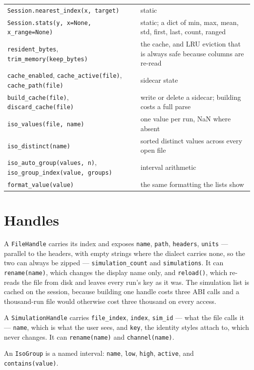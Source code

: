 \documentclass[11pt,a4paper,oneside]{report}
\newcommand{\code}[1]{\texttt{#1}}
\begin{document}
\begin{longtable}{@{}p{}p{}@{}}
\code{Session.nearest\_index(x, target)} & static \\
\code{Session.stats(y, x=None, x\_range=None)} & static; a dict of min, max, mean, std, first, last, count, ranged \\
\code{resident\_bytes}, \code{trim\_memory(keep\_bytes)} & the cache, and LRU eviction that is always safe because columns are re-read \\
\code{cache\_enabled}, \code{cache\_active(file)}, \code{cache\_path(file)} & sidecar state \\
\code{build\_cache(file)}, \code{discard\_cache(file)} & write or delete a sidecar; building costs a full parse \\
\code{iso\_values(file, name)} & one value per run, NaN where absent \\
\code{iso\_distinct(name)} & sorted distinct values across every open file \\
\code{iso\_auto\_group(values, n)}, \code{iso\_group\_index(value, groups)} & interval arithmetic \\
\code{format\_value(value)} & the same formatting the lists show \\
\bottomrule
\end{longtable}
\endgroup

\section{Handles}

A \code{FileHandle} carries its index and exposes \code{name}, \code{path},
\code{headers}, \code{units} --- parallel to the headers, with empty strings
where the dialect carries none, so the two can always be zipped ---
\code{simulation\_count} and \code{simulations}. It can \code{rename(name)},
which changes the display name only, and \code{reload()}, which re-reads the
file from disk and leaves every run's key as it was. The simulation list is
cached on the session, because building one handle costs three ABI calls and a
thousand-run file would otherwise cost three thousand on every access.

A \code{SimulationHandle} carries \code{file\_index}, \code{index},
\code{sim\_id} --- what the file calls it --- \code{name}, which is what the
user sees, and \code{key}, the identity styles attach to, which never changes.
It can \code{rename(name)} and \code{channel(name)}.

An \code{IsoGroup} is a named interval: \code{name}, \code{low}, \code{high},
\code{active}, and \code{contains(value)}.
\end{document}

